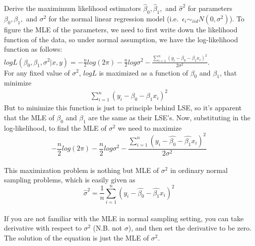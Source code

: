\documentclass[12pt]{article}
\begin{document}
 { Derive the maximimum likelihood estimators $\hat
\beta_0, \hat \beta_1,$ and $\hat \sigma^2$ for parameters $\beta_0,
\beta_1,$ and $\sigma^2$ for the normal linear regression model
(i.e.~$\epsilon_i \sim_{iid} N(0,\sigma^2)$). } { \vfill
  \answer
}
{
To figure the MLE of the parameters, we need to first write down
the likelihood function of the data, so under normal assumption, we
have the log-likelihood function as follows:\\
$logL(\beta_0,\beta_1,\sigma^2|x,y)=-\frac{n}{2}log(2\pi)-\frac{n}{2}log\sigma^2-\frac{\displaystyle\sum_{i=1}^{n}(y_i-\beta_0-\beta_1x_i)^2}{2\sigma^2}.$\\
For any fixed value of $\sigma^2$, $logL$ is maximized as a function
of $\beta_0$ and $\beta_1$, that minimize
\begin{eqnarray}
\displaystyle\sum_{i=1}^{n}(y_i-\beta_0-\beta_1x_i)^2
\end{eqnarray}
But to minimize this function is just to principle behind LSE, so
it's apparent that the MLE of $\beta_0$ and $\beta_1$ are the same
as their LSE's. Now, substituting in the log-likelihood, to find the
MLE of $\sigma^2$ we need to maximize\\
\[-\frac{n}{2}log(2\pi)-\frac{n}{2}log\sigma^2-\frac{\displaystyle\sum_{i=1}^{n}(y_i-\hat{\beta_0}-\hat{\beta_1}x_i)^2}{2\sigma^2}\]\\
This maximization problem is nothing but MLE of $\sigma^2$ in
ordinary normal sampling problems, which is easily given as\\
\[\hat{\sigma}^2=\frac{1}{n}\displaystyle\sum_{i=1}^{n}(y_i-\hat{\beta_0}-\hat{\beta_1}x_i)^2\]\\
If you are not familiar with the MLE in normal sampling setting, you
can take derivative with respect to $\sigma^2$ (N.B. not $\sigma$),
and then set the derivative to be zero. The solution of the equation
is just the MLE of $\sigma^2$.\\
}
\end{document}
